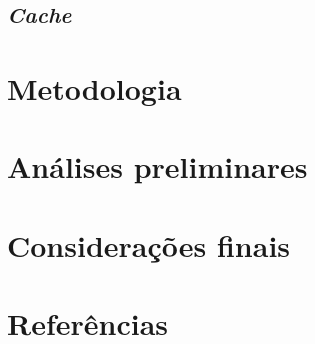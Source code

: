 \documentclass[12pt]{article}
\begin{document}
\subsection{\textit{Cache}}


\section{Metodologia}



\section{Análises preliminares}


\section{Considerações finais}


\section{Referências}


\end{document}
